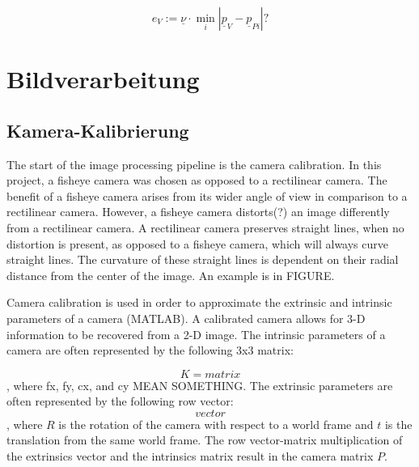 \documentclass[arbeit=studie,oneside,BCOR=12mm]{ArbeitRST}
\begin{document}
    \begin{equation}
        e_V :=  \underline{\nu} \cdot \min_i |\underline{p}_V -  \underline{p}_{Pi}| ?
        \label{eq:Querabweichung}
    \end{equation}

\chapter{Bildverarbeitung}
\section{Kamera-Kalibrierung}
The start of the image processing pipeline is the camera calibration. In this project, a fisheye camera was chosen as opposed to a rectilinear camera. The benefit of a 
fisheye camera arises from its wider angle of view in comparison to a rectilinear camera. However, a fisheye camera distorts(?) an image differently from a rectilinear 
camera. A rectilinear camera preserves straight lines, when no distortion is present, as opposed to a fisheye camera, which will always curve straight lines. The 
curvature of these straight lines is dependent on their radial distance from the center of the image.  An example is in FIGURE.

Camera calibration is used in order to approximate the extrinsic and intrinsic parameters of a camera (MATLAB). A calibrated camera allows for 3-D information to be recovered from a 2-D image. The intrinsic parameters of a camera are often represented by the following 3x3 matrix:

$$K = matrix$$, where fx, fy, cx, and cy MEAN SOMETHING. The extrinsic parameters are often represented by the following row vector:
$$vector$$, where $R$ is the rotation of the camera with respect to a world frame and $t$ is the translation from the same world frame. The row vector-matrix multiplication of the extrinsics vector and the intrinsics matrix result in the camera matrix $P$.
\end{document}
